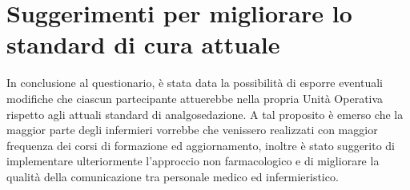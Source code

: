 \section{Suggerimenti per migliorare lo standard di cura attuale}

In conclusione al questionario, è stata data la possibilità di esporre eventuali modifiche che ciascun partecipante attuerebbe nella propria Unità Operativa rispetto agli attuali standard di analgosedazione. A tal proposito è emerso che la maggior parte degli infermieri vorrebbe che venissero realizzati con maggior frequenza dei corsi di formazione ed aggiornamento, inoltre è stato suggerito di implementare ulteriormente l'approccio non farmacologico e di migliorare la qualità della comunicazione tra personale medico ed infermieristico. 